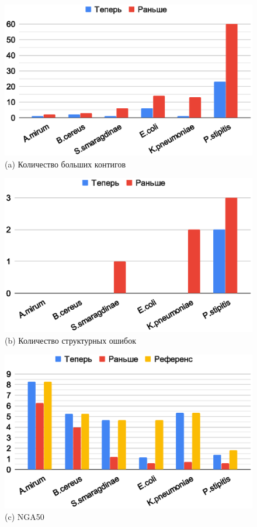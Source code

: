 \documentclass[14pt]{matmex-diploma-custom}
\begin{document}
\begin{figure}[h]
\begin{minipage}{0.5\textwidth}
	\centering
	\includegraphics[scale=0.55]{contigs1.eps} \small{(a) Количество больших контигов}
\end{minipage}
\begin{minipage}{0.5\textwidth}
	\centering
	\includegraphics[scale=0.55]{mis1.eps} \small{(b) Количество структурных ошибок}
\end{minipage}
\begin{minipage}{0.5\textwidth}
	\centering
	\includegraphics[scale=0.55]{nga1.eps} \small{(c) NGA50}

\end{minipage}
\end{figure}
\end{document}
